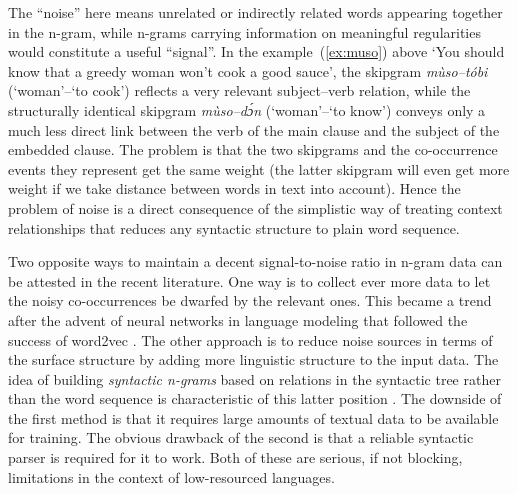 \documentclass[12pt]{article}
\begin{document}
The “noise” here means unrelated or indirectly related words appearing
together in the n-gram, while n-grams carrying information on
meaningful regularities would constitute a useful “signal”. In the
example~(\ref{ex:muso}) above ‘You should know that a greedy woman
won't cook a good sauce’, the skipgram \textit{mùso--tóbi}
(‘woman’--‘to cook’) reflects a very relevant subject--verb relation,
while the structurally identical skipgram \textit{mùso--dɔ́n}
(‘woman’--‘to know’) conveys only a much less direct link between the
verb of the main clause and the subject of the embedded clause. The
problem is that the two skipgrams and the co-occurrence events they
represent get the same weight (the latter skipgram will even get more
weight if we take distance between words in text into account). Hence
the problem of noise is a direct consequence of the simplistic way of
treating context relationships that reduces any syntactic structure to
plain word sequence.

Two opposite ways to maintain a decent signal-to-noise ratio in n-gram
data can be attested in the recent literature. One way is to collect
ever more data to let the noisy co-occurrences be dwarfed by the
relevant ones. This became a trend after the advent of neural networks
in language modeling that followed the success of word2vec
\autocite{mikolov2013distributed}. The other approach is to reduce
noise sources in terms of the surface structure by adding more
linguistic structure to the input data. The idea of building
\textit{syntactic n-grams} based on relations in the syntactic tree
rather than the word sequence is characteristic of this latter
position \autocites{sidorov2014syntactic}. The downside of the first
method is that it requires large amounts of textual data to be
available for training. The obvious drawback of the second is that a
reliable syntactic parser is required for it to work. Both of these
are serious, if not blocking, limitations in the context of
low-resourced languages.
\end{document}
